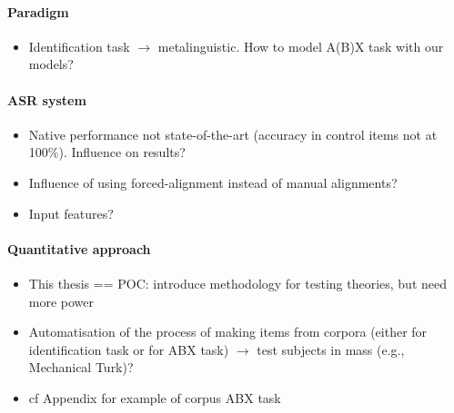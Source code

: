 \paragraph{Paradigm}
\begin{itemize}
  \item Identification task $\rightarrow$ metalinguistic. How to model A(B)X task with our models?
  \end{itemize}

\paragraph{ASR system}
\begin{itemize}
\item Native performance not state-of-the-art (accuracy in control items not at 100\%). Influence on results?
\item Influence of using forced-alignment instead of manual alignments?
\item Input features?
  \end{itemize}

 \paragraph{Quantitative approach}
 \begin{itemize}
   \item This thesis == POC: introduce methodology for testing theories, but need more power 
   \item Automatisation of the process of making items from corpora (either for identification task or for ABX task) $\rightarrow$ test subjects in mass (e.g., Mechanical Turk)? 
\item cf Appendix for example of corpus ABX task
  \end{itemize} 
